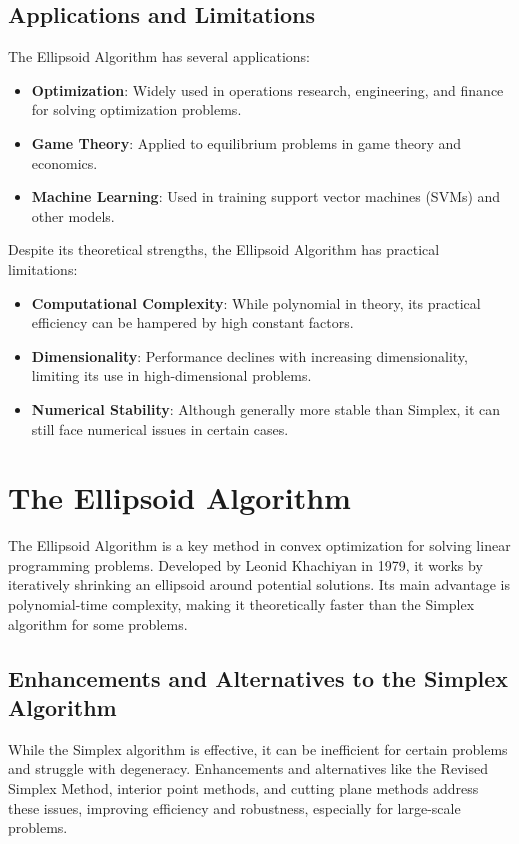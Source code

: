 \documentclass[12pt]{book} %
\begin{document}
\subsection{Applications and Limitations}

The Ellipsoid Algorithm has several applications:

\begin{itemize}
    \item \textbf{Optimization}: Widely used in operations research, engineering, and finance for solving optimization problems.
    
    \item \textbf{Game Theory}: Applied to equilibrium problems in game theory and economics.
    
    \item \textbf{Machine Learning}: Used in training support vector machines (SVMs) and other models.
\end{itemize}

Despite its theoretical strengths, the Ellipsoid Algorithm has practical limitations:

\begin{itemize}
    \item \textbf{Computational Complexity}: While polynomial in theory, its practical efficiency can be hampered by high constant factors.
    
    \item \textbf{Dimensionality}: Performance declines with increasing dimensionality, limiting its use in high-dimensional problems.
    
    \item \textbf{Numerical Stability}: Although generally more stable than Simplex, it can still face numerical issues in certain cases.
\end{itemize}


\section{The Ellipsoid Algorithm}
The Ellipsoid Algorithm is a key method in convex optimization for solving linear programming problems. Developed by Leonid Khachiyan in 1979, it works by iteratively shrinking an ellipsoid around potential solutions. Its main advantage is polynomial-time complexity, making it theoretically faster than the Simplex algorithm for some problems.

\subsection{Enhancements and Alternatives to the Simplex Algorithm}
While the Simplex algorithm is effective, it can be inefficient for certain problems and struggle with degeneracy. Enhancements and alternatives like the Revised Simplex Method, interior point methods, and cutting plane methods address these issues, improving efficiency and robustness, especially for large-scale problems.
\end{document}
